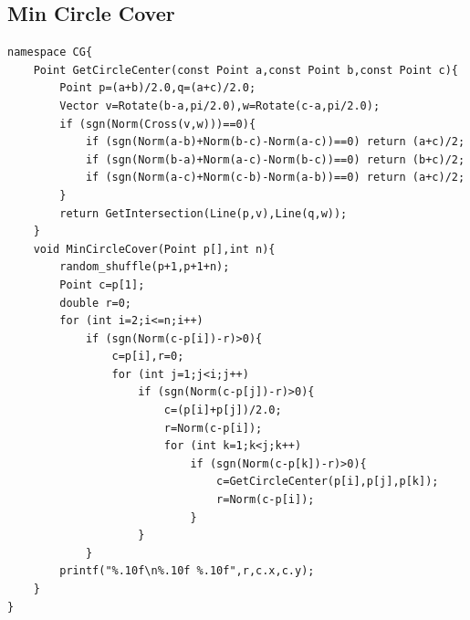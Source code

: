 \documentclass[10pt]{ctexart}
\begin{document}
{\subsection{Min Circle Cover}
\begin{lstlisting}
namespace CG{
    Point GetCircleCenter(const Point a,const Point b,const Point c){
        Point p=(a+b)/2.0,q=(a+c)/2.0;
        Vector v=Rotate(b-a,pi/2.0),w=Rotate(c-a,pi/2.0);
        if (sgn(Norm(Cross(v,w)))==0){
            if (sgn(Norm(a-b)+Norm(b-c)-Norm(a-c))==0) return (a+c)/2;
            if (sgn(Norm(b-a)+Norm(a-c)-Norm(b-c))==0) return (b+c)/2;
            if (sgn(Norm(a-c)+Norm(c-b)-Norm(a-b))==0) return (a+c)/2;
        }
        return GetIntersection(Line(p,v),Line(q,w));
    }
    void MinCircleCover(Point p[],int n){
        random_shuffle(p+1,p+1+n);
        Point c=p[1];
        double r=0;
        for (int i=2;i<=n;i++)
            if (sgn(Norm(c-p[i])-r)>0){
                c=p[i],r=0;
                for (int j=1;j<i;j++)
                    if (sgn(Norm(c-p[j])-r)>0){
                        c=(p[i]+p[j])/2.0;
                        r=Norm(c-p[i]);
                        for (int k=1;k<j;k++)
                            if (sgn(Norm(c-p[k])-r)>0){
                                c=GetCircleCenter(p[i],p[j],p[k]);
                                r=Norm(c-p[i]);
                            }
                    }
            }
        printf("%.10f\n%.10f %.10f",r,c.x,c.y);
    }
}
\end{lstlisting}
}
\end{document}
